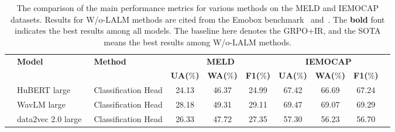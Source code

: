 \documentclass[11pt]{article}
\begin{document}
\begin{table}[ht]
	\caption{The comparison of the main performance metrics for various methods on the MELD and IEMOCAP datasets. Results for W/o-LALM methods are cited from the Emobox benchmark~\cite{ma2024emobox} and~\cite{ma2023emotion2vec}.
		The \textbf{bold} font indicates the best results among all models.
		The baseline here denotes the GRPO+IR, and the SOTA means the best results among W/o-LALM methods.}
	\label{tab:performance}
	\centering
	\small
	\setlength{\tabcolsep}{2.4pt}

	\begin{tabularx}{\textwidth}{>{\raggedright\arraybackslash}p{1.55cm} llccccccc} %
		\toprule
		\multirow{2}{*}{\textbf{Model Type}} & \multirow{2}{*}{\textbf{Model}}                   & \multirow{2}{*}{\textbf{Method}} & \multicolumn{3}{c}{\textbf{MELD}} & \multicolumn{3}{c}{\textbf{IEMOCAP}}                                                                                                                                             \\
		\cmidrule(r){4-6} \cmidrule(l){7-9} %
		                                     &                                                   &                                  & \textbf{UA($\%$)}                 & \textbf{WA($\%$)}                    & \textbf{F1($\%$)}                & \textbf{UA($\%$)}                & \textbf{WA($\%$)}                & \textbf{F1($\%$)}                \\
		\midrule
		\multirow{4}{*}{\mathrm{W/o-LALM} }
		                                     & HuBERT large~\citep{hsu2021hubert}                & Classification Head              & 24.13                             & 46.37                                & 24.99                            & 67.42                            & 66.69                            & 67.24                            \\
		                                     & WavLM large~\citep{chen2022wavlm}                 & Classification Head              & 28.18                             & 49.31                                & 29.11                            & 69.47                            & 69.07                            & 69.29                            \\
		                                     & data2vec 2.0 large~\citep{baevski2023efficient}   & Classification Head              & 26.33                             & 47.72                                & 27.35                            & 57.30                            & 56.23                            & 56.70                            \\

\end{tabularx}
\end{table}
\end{document}
